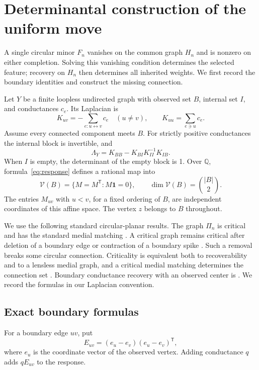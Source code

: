\documentclass[11pt]{article}
\theoremstyle{definition}
\newcommand{\Vresp}{\mathcal V}
\newcommand{\one}{\mathbf 1}
\newcommand{\QQ}{\mathbb Q}
\begin{document}


\section{Determinantal construction of the uniform move}
\label{sec:operations}

A single circular minor $F_n$ vanishes on the common graph $H_n$
and is nonzero on either completion. Solving this vanishing condition
determines the selected feature; recovery on $H_n$ then determines
all inherited weights. We first record the boundary identities and
construct the missing connection.

Let \(Y\) be a finite loopless undirected graph with observed set \(B\), internal
set \(I\), and conductances \(c_e\).
Its Laplacian is
\[
 K_{uv}=-\sum_{e:u\leftrightarrow v}c_e\quad(u\ne v),\qquad
 K_{uu}=\sum_{e\ni u}c_e.
\]
Assume every connected component meets \(B\).
For strictly positive conductances the internal block is invertible, and
\begin{equation}
 \Lambda_Y=K_{BB}-K_{BI}K_{II}^{-1}K_{IB}.
 \label{eq:response}
\end{equation}
When \(I\) is empty, the determinant of the empty block is 1.
Over \(\QQ\), formula~\eqref{eq:response} defines a rational map into
\[
 \Vresp(B)=\{M=M^{\mathsf T}:M\one=0\},\qquad
 \dim\Vresp(B)=\binom{|B|}{2}.
\]
The entries $M_{uv}$ with $u<v$, for a fixed ordering of $B$,
are independent coordinates of this affine space.
The vertex \(z\) belongs to \(B\) throughout.

We use the following standard circular-planar results.
The graph \(\Pi_n\) is critical and has the standard medial matching
\cite[Corollary 1]{ABCC}. A critical graph remains critical after deletion
of a boundary edge or contraction of a boundary spike
\cite[Lemmas 11.1--11.2]{CIM}. Such a removal breaks some circular
connection. Criticality is equivalent both to recoverability and to
a lensless medial graph, and a critical medial matching determines
the connection set \cite[Section 7 and Lemmas 13.1--13.2]{CIM}.
Boundary conductance recovery with an observed center is
\cite[Lemma 10]{ABCC}. We record the formulas in our Laplacian convention.

\subsection{Exact boundary formulas}

For a boundary edge \(uv\), put
\[
 E_{uv}=(e_u-e_v)(e_u-e_v)^{\mathsf T},
\]
where \(e_u\) is the coordinate vector of the observed vertex.
Adding conductance \(q\) adds \(qE_{uv}\) to the response.
\end{document}
